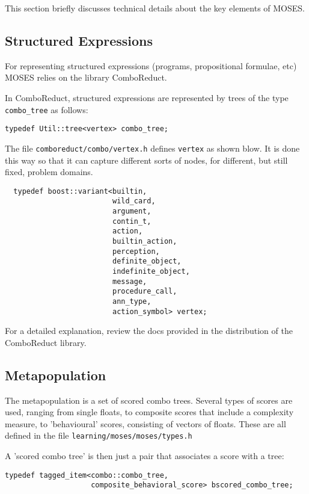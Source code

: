 \documentclass{article}
\begin{document}
This section briefly discusses technical details about the key elements of MOSES.

\subsection{Structured Expressions}

For representing structured expressions (programs, propositional formulae, etc)
MOSES relies on the library ComboReduct.

In ComboReduct, structured expressions are represented 
by trees of the type \verb|combo_tree| as follows:

\verb|typedef Util::tree<vertex> combo_tree;|

The file \verb|comboreduct/combo/vertex.h| defines
\verb|vertex| as shown blow.  It is done this way so that it 
can capture different sorts of nodes, for different, but still
fixed, problem domains.

\begin{verbatim}
  typedef boost::variant<builtin,
                         wild_card,
                         argument,
                         contin_t,
                         action,
                         builtin_action,
                         perception,
                         definite_object,
                         indefinite_object,
                         message,
                         procedure_call,
                         ann_type,
                         action_symbol> vertex;
\end{verbatim}

For a detailed explanation, review the docs provided 
in the distribution of the ComboReduct library.

\subsection{Metapopulation}

The metapopulation is a set of scored combo trees. Several types of scores 
are used, ranging from single floats, to composite scores that include 
a complexity measure, to 'behavioural' scores, consisting of vectors of floats.
These are all defined in the file
\verb|learning/moses/moses/types.h|

A 'scored combo tree' is then just a pair that associates a score with a tree:

\begin{verbatim}
typedef tagged_item<combo::combo_tree,
                    composite_behavioral_score> bscored_combo_tree;
\end{verbatim}
\end{document}
